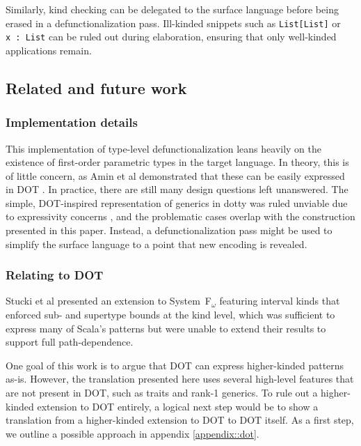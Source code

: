 \documentclass[acmsmall,screen]{acmart}
\begin{document}
Similarly, kind checking can be delegated to the surface language before being
erased in a defunctionalization pass. Ill-kinded snippets such as
\texttt{List[List]} or \texttt{x~:~List} can be ruled out during elaboration,
ensuring that only well-kinded applications remain.

\subsection{Related and future work}

\subsubsection{Implementation details}\label{sec::impl}

This implementation of type-level defunctionalization leans heavily on the
existence of first-order parametric types in the target language. In theory,
this is of little concern, as Amin et al demonstrated that these can be easily
expressed in DOT \cite{amin2016dependent}. In practice, there are still many
design questions left unanswered. The simple, DOT-inspired representation of
generics in dotty was ruled unviable due to expressivity concerns
\cite{OderskyDotty}, and the problematic cases overlap with the construction
presented in this paper. Instead, a defunctionalization pass might be used to
simplify the surface language to a point that new encoding is revealed.

\subsubsection{Relating to DOT}

Stucki et al \cite{Stucki2017HigherOrderSW} presented an extension to
System~F$_\omega$ featuring interval kinds that enforced sub- and supertype
bounds at the kind level, which was sufficient to express many of Scala's
patterns but were unable to extend their results to support full
path-dependence.

One goal of this work is to argue that DOT can express higher-kinded patterns
as-is. However, the translation presented here uses several high-level features
that are not present in DOT, such as traits and rank-1 generics. To rule out a
higher-kinded extension to DOT entirely, a logical next step would be to show a
translation from a higher-kinded extension to DOT to DOT itself. As a first
step, we outline a possible approach in appendix \ref{appendix::dot}.
\end{document}

